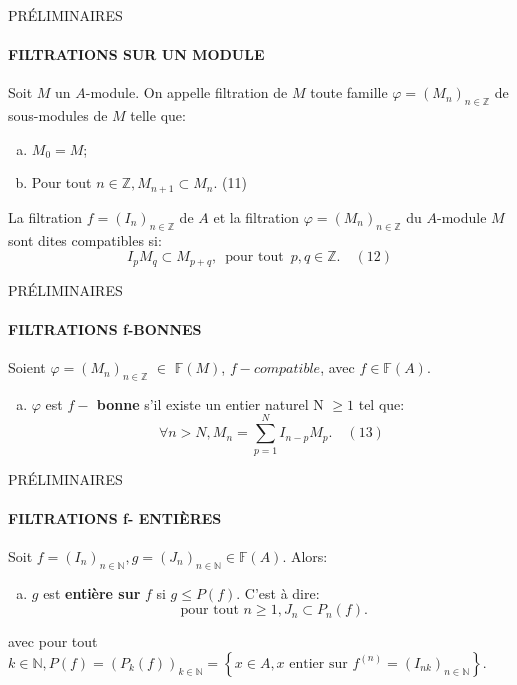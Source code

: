 \documentclass[11pt,a4paper]{beamer}
\begin{document}
		\begin{frame}{PRÉLIMINAIRES}
		\framesubtitle{FILTRATIONS SUR UN MODULE}
		\begin{block}{}
		Soit $M$ un $A$-module. On appelle filtration de $M$ toute famille $\varphi = (M_n)_{n \in \mathbb{Z}}$ de sous-modules de $M$ telle que:
			\begin{enumerate}[(a)]
				\item $M_0 = M$;
				\item Pour tout $n \in \mathbb{Z}, M_{n+1} \subset M_n$. (11)
			\end{enumerate}
			La filtration $f = (I_n)_{n \in \mathbb{Z}}$ de $A$ et la filtration $\varphi = (M_n)_{n \in \mathbb{Z}}$ du $A$-module $M$ sont dites compatibles si:
			\[ I_p M_q \subset M_{p+q} ,\, \text{ pour tout } \, p, q \in \mathbb{Z}. \quad (12)\]
		\end{block}
	\end{frame}
	
	\begin{frame}{PRÉLIMINAIRES}
		\framesubtitle{FILTRATIONS f-BONNES}
		\begin{block}{}
			Soient $\varphi=(M_n)_{n \in \mathbb{Z}}$ $\in$ $\mathbb{F}(M)$, $f-compatible$, avec $f \in \mathbb{F}(A)$.
			\begin{enumerate}[(a)]
				\item $\varphi$ est \textbf{$f-$ bonne} s'il existe un entier naturel N $\geqslant 1$ tel que:
				\[\forall n > N, M_{n}=\sum_{p=1}^{N}I_{n-p}M_{p}. \quad (13)\]
			\end{enumerate}
		\end{block}
	\end{frame}
	
		\begin{frame}{PRÉLIMINAIRES}
		\framesubtitle{FILTRATIONS f- ENTIÈRES}
		\begin{block}{}
			Soit $f=(I_n)_{n \in \mathbb{N}} , g = (J_n)_{n \in \mathbb{N}}\in \mathbb{F}(A)$.  Alors:\\
			\begin{enumerate}[(b)]
					\item $g$ est \textbf{entière sur} $f$ si $g \leqslant P(f)$. C'est à dire:
				\[\text{ pour tout } n \geqslant 1, J_n \subset P_{n}(f). \]
			\end{enumerate}
			avec pour tout $k \in \mathbb{N}, P(f)=(P_k(f))_{k \in \mathbb{N}} =\left\{x \in A, x \text{ entier sur } f^{(n)} = (I_{nk})_{n \in \mathbb{N}}\right\}.$
		\end{block}
	\end{frame}
	
\end{document}
